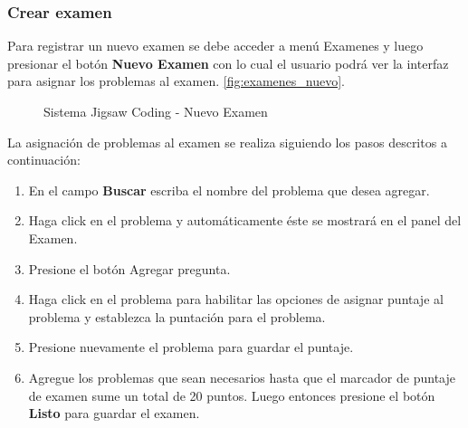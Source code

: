 \subsubsection{Crear examen}

Para registrar un nuevo examen se debe acceder a menú Examenes y luego presionar el botón \textbf{Nuevo Examen} con lo cual el usuario podrá ver la interfaz para asignar los problemas al examen. \autoref{fig:examenes_nuevo}. \\

\begin{figure}
	\centering
	\caption[SJC Nuevo examen]{Sistema Jigsaw Coding - Nuevo Examen}
	\label{fig:examenes_nuevo}
\end{figure}

La asignación de problemas al examen se realiza siguiendo los pasos descritos a continuación:

\begin{enumerate}
	\item En el campo \textbf{Buscar} escriba el nombre del problema que desea agregar.
	\item Haga click en el problema y automáticamente éste se mostrará en el panel del Examen.
	\item Presione el botón Agregar pregunta.
	\item Haga click en el problema para habilitar las opciones de asignar puntaje al problema y establezca la puntación para el problema. 
	\item Presione nuevamente el problema para guardar el puntaje.
	\item Agregue los problemas que sean necesarios hasta que el marcador de puntaje de examen sume un total de 20 puntos. Luego entonces presione el botón \textbf{Listo} para guardar el examen.
\end{enumerate}

